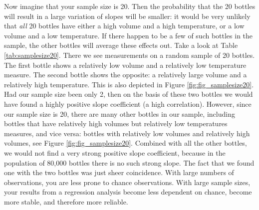 \documentclass[]{book}\usepackage[]{graphicx}\usepackage[]{color}
\begin{document}
Now imagine that your sample size is 20. Then the probability that the 20 bottles will result in a large variation of slopes will be smaller: it would be very unlikely that \textit{all} 20 bottles have either a high volume and a high temperature, or a low volume and a low temperature. If there happen to be a few of such bottles in the sample, the other bottles will average these effects out. Take a look at Table \ref{tab:samplesize20}. There we see measurements on a random sample of 20 bottles. The first bottle shows a relatively low volume and a relatively low temperature measure. The second bottle shows the opposite: a relatively large volume and a relatively high temperature. This is also depicted in Figure \ref{fig:fig_samplesize20}. Had our sample size been only 2, then on the basis of these two bottles we would have found a highly positive slope coefficient (a high correlation). However, since our sample size is 20, there are many other bottles in our sample, including bottles that have relatively high volumes but relatively low temperatures measures, and vice versa: bottles with relatively low volumes and relatively high volumes, see Figure \ref{fig:fig_samplesize20}. Combined with all the other bottles, we would not find a very strong positive slope coefficient, because in the population of 80,000 bottles there is no such strong slope. The fact that we found one with the two bottles was just sheer coincidence. With large numbers of observations, you are less prone to chance observations. With large sample sizes, your results from a regression analysis become less dependent on chance, become more stable, and therefore more reliable. 
\end{document}
